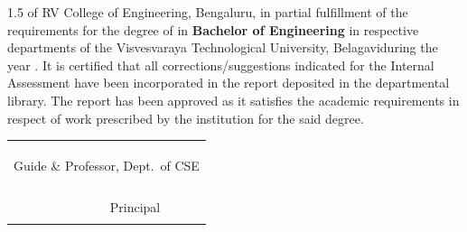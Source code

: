 \begin{spacing}{1.5}
{	}\fi of RV College of Engineering, Bengaluru, in partial fulfillment of the requirements for the degree of \ifPG \textbf{\printMastersInLF} in \textbf{\printMastersPrgName} \else\textbf{Bachelor of Engineering} in \ifIDP respective departments \else \textbf{\printDepartmentLF} \fi\fi \ifIDP \else of the Visvesvaraya Technological University, Belagavi\space\fi during the year \printAcadYear. It is certified that all corrections/suggestions indicated for the Internal Assessment have been incorporated in the \else {}\else{}\else{}\fi\fi\fi\fi report deposited in the departmental library. The \else{} \else {} \else {}\fi\fi\fi\fi report has been approved as it satisfies the academic requirements in respect of  \else{}\else{}\else{}\fi\fi\fi\fi work prescribed by the institution for the said degree. \par
\end{spacing}
\ifIDP
\begin{table}[H]
\centering
\begin{tabular}{p{}p{}p{}}
	& & \\
	& & \\
	\multicolumn{3}{c}{\printGuideNameA} \\
	\multicolumn{3}{c}{Guide \& Professor, Dept.\ of CSE} \\
	& & \\
	& & \\
	& & \\
	\centering{\printDA} & & \multicolumn{1}{c}{\printPrincipal} \\
	\centering{Dean Academics} & & \multicolumn{1}{c}{Principal} \\
	& & \\
\end{tabular}%
\end{table}
